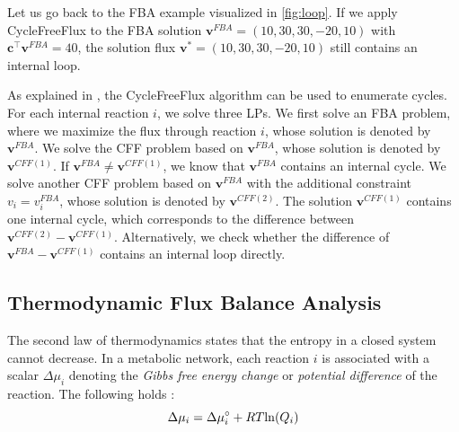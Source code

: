 Let us go back to the \textsf{FBA} example visualized in \cref{fig:loop}. If we apply \textsf{CycleFreeFlux} to the \textsf{FBA} solution $\mathbf v^{FBA} = (10,30,30,-20,10)$ with $\mathbf c^\intercal \mathbf v^{FBA} = 40$, the solution flux 
$\mathbf v^* = (10,30,30,-20,10)$ still contains an internal loop.

As explained in \cite{desouki_cyclefreeflux_2015-1}, the \textsf{CycleFreeFlux} algorithm can be used to enumerate cycles. For each internal reaction $i$, we solve three LPs. 
We first solve an \textsf{FBA} problem, where we maximize the flux through reaction $i$, whose solution is denoted by $\mathbf v^{FBA}$. We solve the \textsf{CFF} problem based on $\mathbf v^{FBA}$, whose solution is denoted by $\mathbf v^{CFF(1)}$. If $\mathbf v^{FBA} \neq \mathbf v^{CFF(1)}$, we know that $\mathbf v^{FBA}$ contains an internal cycle. We solve another \textsf{CFF} problem based on $\mathbf v^{FBA}$ with the additional constraint $v_i = v_i^{FBA}$, whose solution is denoted by $\mathbf v^{CFF(2)}$. The solution $\mathbf v^{CFF(1)}$ contains one internal cycle, which corresponds to the difference between $\mathbf v^{CFF(2)} - \mathbf v^{CFF(1)}$. Alternatively, we check whether the difference of $\mathbf v^{FBA} - \mathbf v^{CFF(1)}$ contains an internal loop directly.





\subsection{Thermodynamic Flux Balance Analysis}
The second law of thermodynamics states that the entropy in a closed system cannot decrease. In a metabolic network, each reaction $i$ is associated with a scalar $\Delta \mu_i$ denoting the \textit{Gibbs free energy change} %
or \textit{potential difference} of the reaction.
The following holds \cite{elimination_infeasible_loops}: 
\begin{equation*}
    \Delta \mu_i = \Delta \mu \degree_i + RT \mathrm{ln} (Q_i)
\end{equation*}


